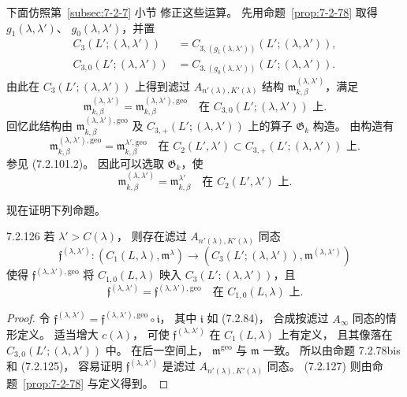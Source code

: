 下面仿照第~\ref{subsec:7-2-7} 小节
修正这些运算。
先用命题~\ref{prop:7-2-78}
取得 $g_1(\lambda,\lambda')$、
$g_0(\lambda,\lambda')$，并置
\[
\begin{aligned}
C_3(L';(\lambda,\lambda'))
&=C_{3,(g_1(\lambda,\lambda'))}
(L';(\lambda,\lambda')),\\
C_{3,0}(L';(\lambda,\lambda'))
&=C_{3,(g_0(\lambda,\lambda'))}
(L';(\lambda,\lambda')).
\end{aligned}
\]
由此在 $C_3(L';(\lambda,\lambda'))$
上得到滤过 $A_{n'(\lambda),K'(\lambda)}$ 结构
$\mathfrak m^{(\lambda,\lambda')}_{k,\beta}$，满足
\begin{equation}
\mathfrak m^{(\lambda,\lambda')}_{k,\beta}
=\mathfrak m^{(\lambda,\lambda'),\mathrm{geo}}_{k,\beta}
\quad\text{在 }C_{3,0}(L';(\lambda,\lambda'))\text{ 上}.
\tag{7.2.125}\label{eq:7-2-125}
\end{equation}
回忆此结构由
$\mathfrak m^{(\lambda,\lambda'),\mathrm{geo}}_{k,\beta}$
及 $C_{3,+}(L';(\lambda,\lambda'))$
上的算子 $\mathfrak G_k$ 构造。
由构造有
\[
\mathfrak m^{(\lambda,\lambda'),\mathrm{geo}}_{k,\beta}
=\mathfrak m^{\lambda',\mathrm{geo}}_{k,\beta}
\quad\text{在 }
C_2(L',\lambda')\subset C_{3,+}(L';(\lambda,\lambda'))
\text{ 上}.
\]
参见 (7.2.101.2)。
因此可以选取 $\mathfrak G_k$，使
\[
\mathfrak m^{(\lambda,\lambda')}_{k,\beta}
=\mathfrak m^{\lambda'}_{k,\beta}
\quad\text{在 }C_2(L',\lambda')\text{ 上}.
\]

现在证明下列命题。
\begin{proposition}{7.2.126}\label{prop:7-2-126}
若 $\lambda'>C(\lambda)$，
则存在滤过 $A_{n'(\lambda),K'(\lambda)}$ 同态
\[
\mathfrak f^{(\lambda,\lambda')}
\colon(C_1(L,\lambda),\mathfrak m^\lambda)
\longrightarrow
(C_3(L';(\lambda,\lambda')),
\mathfrak m^{(\lambda,\lambda')})
\]
使得
$\mathfrak f^{(\lambda,\lambda'),\mathrm{geo}}$
将 $C_{1,0}(L,\lambda)$ 映入
$C_3(L';(\lambda,\lambda'))$，且
\begin{equation}
\mathfrak f^{(\lambda,\lambda')}
=\mathfrak f^{(\lambda,\lambda'),\mathrm{geo}}
\quad\text{在 }C_{1,0}(L,\lambda)\text{ 上}.
\tag{7.2.127}\label{eq:7-2-127}
\end{equation}
\end{proposition}

\begin{proof}
令
$\mathfrak f^{(\lambda,\lambda')}
=\mathfrak f^{(\lambda,\lambda'),\mathrm{geo}}
\circ\mathfrak i$，
其中 $\mathfrak i$ 如 (7.2.84)，
合成按滤过 $A_\infty$ 同态的情形定义。
适当增大 $c(\lambda)$，
可使 $\mathfrak f^{(\lambda,\lambda')}$
在 $C_1(L,\lambda)$ 上有定义，
且其像落在 $C_{3,0}(L';(\lambda,\lambda'))$ 中。
在后一空间上，
$\mathfrak m^{\mathrm{geo}}$ 与 $\mathfrak m$ 一致。
所以由命题 7.2.78bis 和 (7.2.125)，
容易证明 $\mathfrak f^{(\lambda,\lambda')}$
是滤过 $A_{n'(\lambda),K'(\lambda)}$ 同态。
(7.2.127) 则由命题~\ref{prop:7-2-78}
与定义得到。
\end{proof}


